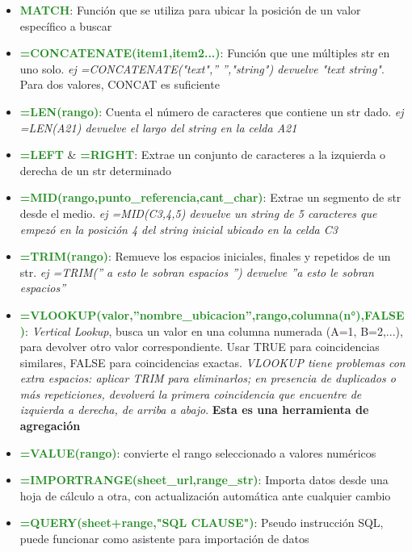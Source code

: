 \begin{itemize}
    \item {\textcolor{ForestGreen}{\textbf{MATCH}}: Función que se utiliza para ubicar la posición de un valor específico a buscar}
    \item {\textcolor{ForestGreen}{\textbf{=CONCATENATE(item1,item2...)}}: Función que une múltiples \gls{str} en uno solo. \textit{ej =CONCATENATE("text",'' '',"string") devuelve "text string"}. Para dos valores, CONCAT es suficiente}
    \item {\textcolor{ForestGreen}{\textbf{=LEN(rango)}}: Cuenta el número de caracteres que contiene un \gls{str} dado. \textit{ej =LEN(A21) devuelve el largo del string en la celda A21}}
    \item {\textcolor{ForestGreen}{\textbf{=LEFT}} \& \textcolor{ForestGreen}{\textbf{=RIGHT}}: Extrae un conjunto de caracteres a la izquierda o derecha de un \gls{str} determinado}
    \item {\textcolor{ForestGreen}{\textbf{=MID(rango,punto\_referencia,cant\_char)}}: Extrae un segmento de \gls{str} desde el medio. \textit{ej =MID(C3,4,5) devuelve un string de 5 caracteres que empezó en la posición 4 del string inicial ubicado en la celda C3}}
    \item {\textcolor{ForestGreen}{\textbf{=TRIM(rango)}}: Remueve los espacios iniciales, finales y repetidos de un \gls{str}. \textit{ej =TRIM('' a esto le sobran espacios  '') devuelve ''a esto le sobran espacios''}}
    \item {\textcolor{ForestGreen}{\textbf{=VLOOKUP(valor,''nombre\_ubicacion'',rango,columna(n°),FALSE)}}: \textit{Vertical Lookup}, busca un valor en una columna numerada (A=1, B=2,...), para devolver otro valor correspondiente. Usar TRUE para coincidencias similares, FALSE para coincidencias exactas. \textit{VLOOKUP tiene problemas con extra espacios: aplicar TRIM para eliminarlos; en presencia de duplicados o más repeticiones, devolverá la primera coincidencia que encuentre de izquierda a derecha, de arriba a abajo}. \textbf{Esta es una herramienta de agregación}}
    \item {\textcolor{ForestGreen}{\textbf{=VALUE(rango)}}: convierte el rango seleccionado a valores numéricos}
    \item {\textcolor{ForestGreen}{\textbf{=IMPORTRANGE(sheet\_url,range\_str)}}: Importa datos desde una hoja de cálculo a otra, con actualización automática ante cualquier cambio}
    \item {\textcolor{ForestGreen}{\textbf{=QUERY(sheet+range,"SQL CLAUSE")}}: Pseudo instrucción SQL, puede funcionar como asistente para importación de datos}

\end{itemize}
